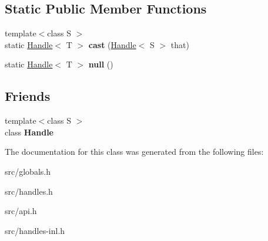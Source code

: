 \subsection*{Static Public Member Functions}
\begin{DoxyCompactItemize}
\item 
\hypertarget{classv8_1_1internal_1_1_handle_a2144b60894705914ecc244039d905b08}{}{\footnotesize template$<$class S $>$ }\\static \hyperlink{classv8_1_1internal_1_1_handle}{Handle}$<$ T $>$ {\bfseries cast} (\hyperlink{classv8_1_1internal_1_1_handle}{Handle}$<$ S $>$ that)\label{classv8_1_1internal_1_1_handle_a2144b60894705914ecc244039d905b08}

\item 
\hypertarget{classv8_1_1internal_1_1_handle_ae26f83fe2ce0d09c7453dd3317e56c97}{}static \hyperlink{classv8_1_1internal_1_1_handle}{Handle}$<$ T $>$ {\bfseries null} ()\label{classv8_1_1internal_1_1_handle_ae26f83fe2ce0d09c7453dd3317e56c97}

\end{DoxyCompactItemize}
\subsection*{Friends}
\begin{DoxyCompactItemize}
\item 
\hypertarget{classv8_1_1internal_1_1_handle_a67ca1a2d91273eaf85fb3d23ba8ce984}{}{\footnotesize template$<$class S $>$ }\\class {\bfseries Handle}\label{classv8_1_1internal_1_1_handle_a67ca1a2d91273eaf85fb3d23ba8ce984}

\end{DoxyCompactItemize}


The documentation for this class was generated from the following files\+:\begin{DoxyCompactItemize}
\item 
src/globals.\+h\item 
src/handles.\+h\item 
src/api.\+h\item 
src/handles-\/inl.\+h\end{DoxyCompactItemize}
